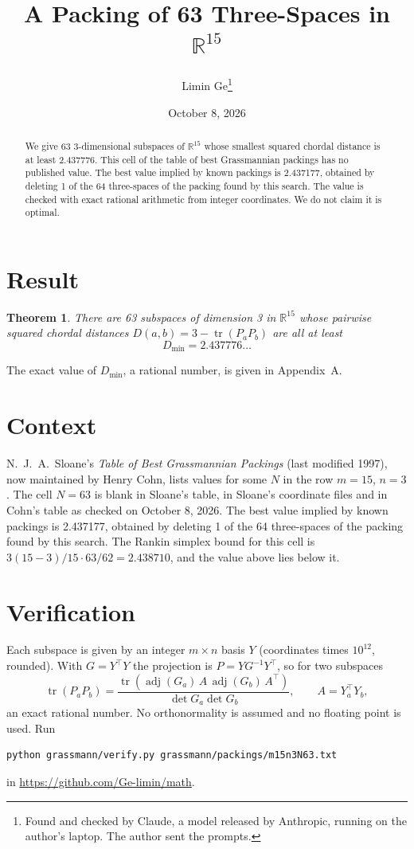 \documentclass[11pt,a4paper]{article}
\title{A Packing of 63 Three-Spaces in $\mathbb{R}^{15}$}
\author{Limin Ge\thanks{Found and checked by Claude, a model released by Anthropic, running on the author's laptop. The author sent the prompts.}}
\date{October 8, 2026}
\newtheorem*{theorem}{Theorem}
\begin{document}
\maketitle
\begin{abstract}
We give 63 3-dimensional subspaces of $\mathbb{R}^{15}$ whose smallest squared chordal distance is at least 2.437776. This cell of the table of best Grassmannian packings has no published value. The best value implied by known packings is 2.437177, obtained by deleting 1 of the 64 three-spaces of the packing found by this search. The value is checked with exact rational arithmetic from integer coordinates. We do not claim it is optimal.
\end{abstract}

\section{Result}
\begin{theorem}
There are 63 subspaces of dimension 3 in $\mathbb{R}^{15}$ whose pairwise squared chordal distances $D(a,b) = 3 - \operatorname{tr}(P_aP_b)$ are all at least
\[ D_{\min} = 2.437776\ldots \]
\end{theorem}
The exact value of $D_{\min}$, a rational number, is given in Appendix~A.


\section{Context}
N.~J.~A.~Sloane's \emph{Table of Best Grassmannian Packings} (last modified 1997), now maintained by Henry Cohn, lists values for some $N$ in the row $m=15$, $n=3$. The cell $N=63$ is blank in Sloane's table, in Sloane's coordinate files and in Cohn's table as checked on October 8, 2026. The best value implied by known packings is 2.437177, obtained by deleting 1 of the 64 three-spaces of the packing found by this search. The Rankin simplex bound for this cell is $3(15-3)/15\cdot 63/62 = 2.438710$, and the value above lies below it.


\section{Verification}
Each subspace is given by an integer $m\times n$ basis $Y$ (coordinates times $10^{12}$, rounded). With $G=Y^\top Y$ the projection is $P=YG^{-1}Y^\top$, so for two subspaces
\[ \operatorname{tr}(P_aP_b)=\frac{\operatorname{tr}(\operatorname{adj}(G_a)\,A\,\operatorname{adj}(G_b)\,A^\top)}{\det G_a\det G_b},\qquad A=Y_a^\top Y_b, \]
an exact rational number. No orthonormality is assumed and no floating point is used. Run
\begin{verbatim}
python grassmann/verify.py grassmann/packings/m15n3N63.txt
\end{verbatim}
in \url{https://github.com/Ge-limin/math}.
\end{document}
